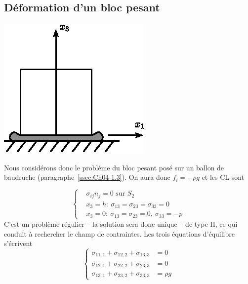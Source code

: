\subsection{Déformation d'un bloc pesant}
\begin{multicols}{2}
    \begin{center}
        \includegraphics{../images/T1_Ch06-01}
    \end{center}
    \columnbreak
    Nous considérons donc le problème du bloc pesant posé sur un ballon de baudruche (paragraphe~\ref{ssec:Ch04-1.3}).
    On aura donc $f_i = -\rho g$ et les CL sont
\end{multicols}
\begin{equation}
    \left\{
    \begin{aligned}
        & \sigma_{ij} n_j = 0 \text{ sur } S_2 \\
        & x_3 = h:\ \sigma_{13} = \sigma_{23} = \sigma_{33} = 0 \\
        & x_3 = 0:\ \sigma_{13} = \sigma_{23} = 0, \ \sigma_{33} = -p
    \end{aligned}
    \right.
    \label{eq:Ch06-032}
\end{equation}
C'est un problème régulier -- la solution sera donc unique -- de type II, ce qui conduit à rechercher le champ de contraintes.
Les trois équations d'équilibre s'écrivent
\begin{equation}
    \left\{
    \begin{aligned}
        \sigma_{11,1} + \sigma_{12,2} + \sigma_{13,3} &= 0 \\
        \sigma_{12,1} + \sigma_{22,2} + \sigma_{23,3} &= 0 \\
        \sigma_{13,1} + \sigma_{23,2} + \sigma_{33,3} &= \rho g
    \end{aligned}
    \right.
    \label{eq:Ch06-033}
\end{equation}

